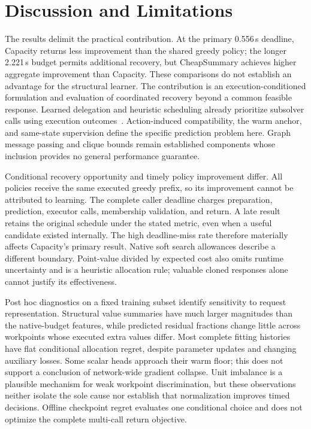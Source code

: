 \section{Discussion and Limitations}
\label{sec:discussion-residual}

The results delimit the practical contribution. At the primary 0.556\,s
deadline, Capacity returns less improvement than the shared greedy policy;
the longer 2.221\,s budget permits additional recovery, but CheapSummary
achieves higher aggregate improvement than Capacity. These comparisons do
not establish an advantage for the structural learner. The contribution is
an execution-conditioned formulation and evaluation of coordinated recovery
beyond a common feasible response. Learned delegation and heuristic
scheduling already prioritize subsolver calls using execution
outcomes~\cite{li2021delegate,chmiela2021schedule}. Action-induced
compatibility, the warm anchor, and same-state supervision define the
specific prediction problem here. Graph message passing and clique bounds
remain established components whose inclusion provides no general
performance guarantee.

Conditional recovery opportunity and timely policy improvement differ.
All policies receive the same executed greedy prefix, so its improvement
cannot be attributed to learning. The complete caller deadline charges
preparation, prediction, executor calls, membership validation, and return.
A late result retains the original schedule under the stated metric, even
when a useful candidate existed internally. The high deadline-miss rate
therefore materially affects Capacity's primary result. Native soft search
allowances describe a different boundary. Point-value divided by expected
cost also omits runtime uncertainty and is a heuristic allocation rule;
valuable cloned responses alone cannot justify its effectiveness.

Post hoc diagnostics on a fixed training subset identify sensitivity to
request representation. Structural value summaries have much larger
magnitudes than the native-budget features, while predicted residual
fractions change little across workpoints whose executed extra values
differ. Most complete fitting histories have flat conditional allocation
regret, despite parameter updates and changing auxiliary losses. Some
scalar heads approach their warm floor; this does not support a conclusion
of network-wide gradient collapse. Unit imbalance is a plausible mechanism
for weak workpoint discrimination, but these observations neither isolate
the sole cause nor establish that normalization improves timed decisions.
Offline checkpoint regret evaluates one conditional choice and does not
optimize the complete multi-call return objective.


